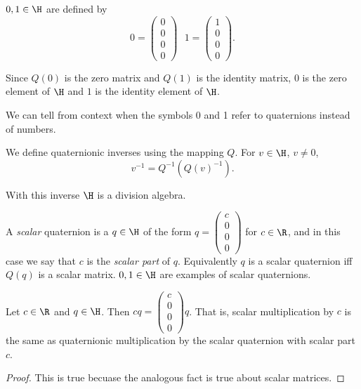 \documentclass[oneside,12pt]{amsart}
\begin{document}
\begin{definition}
$0,1\in\H$ are defined by
$$0=\begin{pmatrix}0\\0\\0\\0\end{pmatrix}\text{   }
1=\begin{pmatrix}1\\0\\0\\0\end{pmatrix}.$$

Since $Q(0)$ is the zero matrix and $Q(1)$ is the identity matrix,
$0$ is the zero element of $\H$ and $1$ is the identity element
of $\H$.

We can tell from context when the symbols 0 and 1 refer to
quaternions instead of numbers.
\end{definition}

\begin{definition}
We define quaternionic inverses using the mapping $Q$.
For $v\in\H$, $v\not=0$,
$$v^{-1} = Q^{-1}(Q(v)^{-1}).$$

With this inverse $\H$ is a division algebra.
\end{definition}

\begin{definition}
A \emph{scalar} quaternion is a $q\in\H$ of the form
$q=\begin{pmatrix}c\\0\\0\\0\end{pmatrix}$ for $c\in\R$,
and in this case we say that $c$ is the \emph{scalar part}
of $q$.
Equivalently $q$ is a scalar quaternion iff $Q(q)$ is
a scalar matrix. $0,1\in\H$ are examples of scalar quaternions.
\end{definition}

\begin{lemma}
Let $c\in\R$ and $q\in\H$.
Then $cq = \begin{pmatrix}c\\0\\0\\0\end{pmatrix} q$. That is,
scalar multiplication by $c$ is the same as quaternionic
multiplication by the scalar quaternion with scalar part $c$.
\end{lemma}
\begin{proof}
This is true becuase the analogous fact is true about scalar matrices.
\end{proof}
\end{document}
